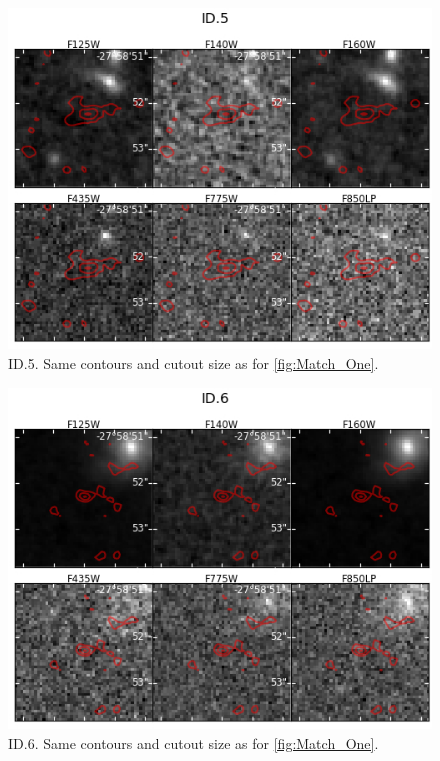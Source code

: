 \begin{figure}[tbp]
\centering \includegraphics[width=160mm]{Matched/ASPECS_Cutout_4.jpg}
\caption{ID.5. Same contours and cutout size as for \ref{fig:Match_One}.}
\label{fig:Match_Four}
\end{figure}

\begin{figure}[tbp]
\centering \includegraphics[width=160mm]{Matched/ASPECS_Cutout_5.jpg}
\caption{ID.6. Same contours and cutout size as for \ref{fig:Match_One}.}
\label{fig:Match_Five}
\end{figure}

